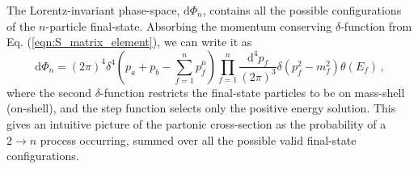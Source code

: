 \documentclass[main.tex]{subfiles}
\begin{document}
    The Lorentz-invariant phase-space, $\mathrm{d}\Phi_{n}$,
    contains all the possible
    configurations of the $n$-particle final-state.
    Absorbing the momentum conserving $\delta$-function
    from Eq. (\ref{eqn:S_matrix_element}),
    we can write it as
    \begin{equation}\label{eqn:dlips_4d}
        \mathrm{d}\Phi_{n} = (2\pi)^{4}\delta^{4}\left(p_{a} + p_{b} - \sum_{f=1}^{n} p_{f}^{\mu}\right) \prod_{f=1}^{n} \dfrac{\mathrm{d}^{4}p_{f}}{(2\pi)^{3}}\delta(p_{f}^{2} - m_{f}^{2})\theta(E_{f}) \, ,
    \end{equation}
    where the second $\delta$-function restricts
    the final-state particles to be on mass-shell
    (on-shell), and the step function selects only
    the positive energy solution.
    This gives an intuitive picture of the partonic
    cross-section as the probability of a $2\rightarrow n$
    process occurring, summed over all the possible
    valid final-state configurations.
\end{document}
